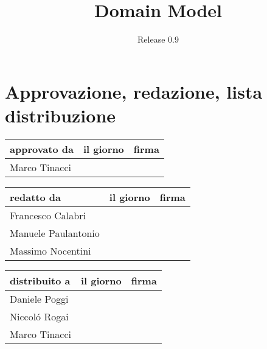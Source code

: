 \documentclass[a4paper, 12pt]{article}
\title{Domain Model}
\author{Release 0.9}
\date{\today \\Firenze \\\begin{figure}[h] \centering
\texttt{[image: ../../../images/logokiwi.png]} 
\end{figure}
}
\begin{document}
\maketitle

\newpage

\section*{Approvazione, redazione, lista distribuzione}
\begin{table}[h!]
  \begin{center}
    \begin{tabular}{| l | l | p{60mm} |}
    \hline
    \textbf{approvato da} & \textbf{il giorno} & \textbf{firma} \\
	\hline    
	Marco Tinacci &  &  \\
    \hline
    \end{tabular}
  \end{center}
\end{table}

\begin{table}[h!]
  \begin{center}
    \begin{tabular}{| l | l | p{60mm} |}
    \hline
    \textbf{redatto da} & \textbf{il giorno} & \textbf{firma} \\
    \hline
    Francesco Calabri &  &  \\
    \hline
	Manuele Paulantonio &  &  \\
    \hline    
	Massimo Nocentini &  &  \\
    \hline
    \end{tabular}
  \end{center}
\end{table}

\begin{table}[h!]
  \begin{center}
    \begin{tabular}{| l | l | p{60mm} |}
    \hline
    \textbf{distribuito a} & \textbf{il giorno} & \textbf{firma} \\
	\hline    
	Daniele Poggi &  &  \\
    \hline
	Niccol\'o Rogai &  &  \\
    \hline
	Marco Tinacci &  &  \\
    \hline
    \end{tabular}
  \end{center}
\end{table}
\end{document}
